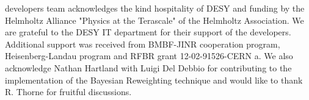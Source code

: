 %
%

\begin{acknowledgements}
\fitter developers team acknowledges the kind hospitality of DESY 
and funding by the Helmholtz Alliance "Physics at the Terascale" of the Helmholtz Association.
We are grateful to the DESY IT department for their support of the \fitter  developers.
Additional support was received from BMBF-JINR cooperation program,
Heisenberg-Landau program and RFBR grant 12-02-91526-CERN a.
We also acknowledge Nathan Hartland with Luigi Del Debbio for contributing to the 
implementation of the Bayesian Reweighting technique and
would like to thank R. Thorne for fruitful discussions.
\end{acknowledgements}



